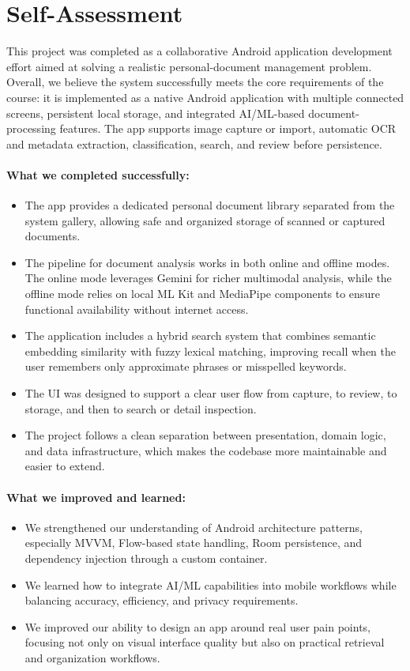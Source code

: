 \section{Self-Assessment}

This project was completed as a collaborative Android application development effort aimed at solving a realistic personal-document management problem. Overall, we believe the system successfully meets the core requirements of the course: it is implemented as a native Android application with multiple connected screens, persistent local storage, and integrated AI/ML-based document-processing features. The app supports image capture or import, automatic OCR and metadata extraction, classification, search, and review before persistence.

\paragraph{What we completed successfully:}
\begin{itemize}
    \item The app provides a dedicated personal document library separated from the system gallery, allowing safe and organized storage of scanned or captured documents.
    \item The pipeline for document analysis works in both online and offline modes. The online mode leverages Gemini for richer multimodal analysis, while the offline mode relies on local ML Kit and MediaPipe components to ensure functional availability without internet access.
    \item The application includes a hybrid search system that combines semantic embedding similarity with fuzzy lexical matching, improving recall when the user remembers only approximate phrases or misspelled keywords.
    \item The UI was designed to support a clear user flow from capture, to review, to storage, and then to search or detail inspection.
    \item The project follows a clean separation between presentation, domain logic, and data infrastructure, which makes the codebase more maintainable and easier to extend.
\end{itemize}

\paragraph{What we improved and learned:}
\begin{itemize}
    \item We strengthened our understanding of Android architecture patterns, especially MVVM, Flow-based state handling, Room persistence, and dependency injection through a custom container.
    \item We learned how to integrate AI/ML capabilities into mobile workflows while balancing accuracy, efficiency, and privacy requirements.
    \item We improved our ability to design an app around real user pain points, focusing not only on visual interface quality but also on practical retrieval and organization workflows.
\end{itemize}

